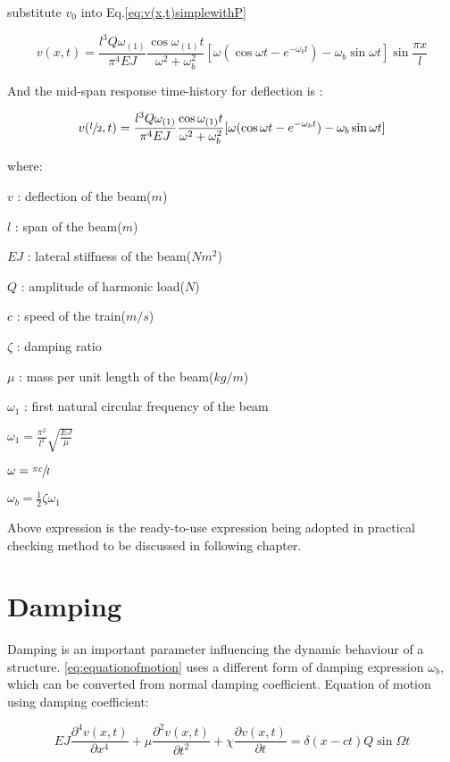 \begin{appendices}
substitute $v_0$ into Eq.\ref{eq:v(x,t)simplewithP}

\begin{equation}
    v(x,t) = \frac{l^3Q\omega_{(1)}}{\pi^4 EJ}\frac{\cos \omega_{(1)}t}{\omega^2+\omega_b^2}[\omega(\cos\omega t - e^{-\omega_b t})-\omega_b\sin\omega t]\sin\frac{\pi x}{l}
\end{equation}

And the mid-span response time-history for deflection is :

\begin{equation}\label{eq:v(x,t)simpleharmonic}
    v(\sfrac{l}{2},t) = \frac{l^3Q\omega_{(1)}}{\pi^4 EJ}\frac{\cos \omega_{(1)}t}{\omega^2+\omega_b^2}[\omega(\cos\omega t - e^{-\omega_b t})-\omega_b\sin\omega t]
\end{equation}

where:

$v$ : deflection of the beam($m$)

$l$ : span of the beam($m$)

$EJ$ : lateral stiffness of the beam($Nm^2$)

$Q$ : amplitude of harmonic load($N$)

$c$ : speed of the train($m/s$)

$\zeta$ : damping ratio

$\mu$ : mass per unit length of the beam($kg/m$)

$\omega_1$ : first natural circular frequency of the beam

$\omega_1=\frac{\pi^2}{l^2}\sqrt{\frac{EJ}{\mu}}$

$\omega = \sfrac{\pi c}{l}$

$\omega_b = \frac{1}{2}\zeta\omega_1 $


 
Above expression is the ready-to-use expression being adopted in practical checking method to be discussed in following chapter.


\section{Damping}
Damping is an important parameter influencing the dynamic behaviour of a structure. \ref{eq:equationofmotion} uses a different form of damping expression $\omega_b$, which can be converted from normal damping coefficient. Equation of motion using damping coefficient:

\begin{equation}\label{eq:equationofmotiondampingcoefficient}
    EJ\frac{\partial^4 v(x,t)}{\partial x^4} + \mu\frac{\partial^2 v(x,t)}{\partial t^2} +\chi \frac{\partial v(x,t)}{\partial t} = \delta(x-ct)Q\sin\Omega t 
\end{equation}


\end{appendices}
